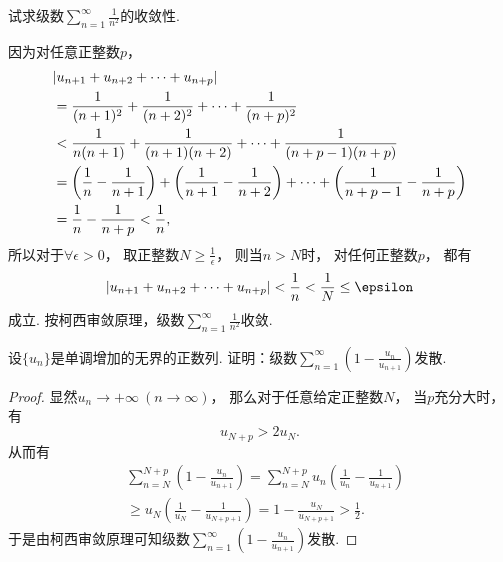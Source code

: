 \begin{example}\label{example:无穷级数.zeta2的敛散性}
试求级数\(\sum_{n=1}^\infty \frac{1}{n^2}\)的收敛性.
\begin{solution}
因为对任意正整数\(p\)，\begin{align*}
	&\abs{u_{n+1}+u_{n+2}+\dotsb+u_{n+p}} \\
	&=\frac{1}{(n+1)^2}+\frac{1}{(n+2)^2}+\dotsb+\frac{1}{(n+p)^2} \\
	&<\frac{1}{n(n+1)}+\frac{1}{(n+1)(n+2)}+\dotsb+\frac{1}{(n+p-1)(n+p)} \\
	&=\left(\frac{1}{n}-\frac{1}{n+1}\right)
		+\left(\frac{1}{n+1}-\frac{1}{n+2}\right)
		+\dotsb+\left(\frac{1}{n+p-1}-\frac{1}{n+p}\right) \\
	&=\frac{1}{n}-\frac{1}{n+p} < \frac{1}{n},
\end{align*}
所以对于\(\forall \epsilon > 0\)，
取正整数\(N \geq \frac{1}{\epsilon}\)，
则当\(n > N\)时，
对任何正整数\(p\)，
都有\begin{equation*}
	\abs{u_{n+1}+u_{n+2}+\dotsb+u_{n+p}}
	< \frac{1}{n}
	< \frac{1}{N}
	\leq \epsilon
\end{equation*}成立.
按柯西审敛原理，级数\(\sum_{n=1}^\infty \frac{1}{n^2}\)收敛.
\end{solution}
\end{example}

\begin{example}
设\(\{u_n\}\)是单调增加的无界的正数列.
证明：级数\(\sum_{n=1}^\infty \left(1-\frac{u_n}{u_{n+1}}\right)\)发散.
\begin{proof}
显然\(u_n\to+\infty\ (n\to\infty)\)，
那么对于任意给定正整数\(N\)，
当\(p\)充分大时，
有\begin{equation*}
	u_{N+p} > 2 u_N.
\end{equation*}
从而有\begin{align*}
	&\sum_{n=N}^{N+p} \left(1-\frac{u_n}{u_{n+1}}\right)
	= \sum_{n=N}^{N+p} u_n \left(\frac1{u_n}-\frac1{u_{n+1}}\right) \\
	&\geq u_N \left(\frac1{u_N}-\frac1{u_{N+p+1}}\right)
	= 1-\frac{u_N}{u_{N+p+1}}
	> \frac12.
\end{align*}
于是由{柯西审敛原理}可知级数\(\sum_{n=1}^\infty \left(1-\frac{u_n}{u_{n+1}}\right)\)发散.
\end{proof}
\end{example}

